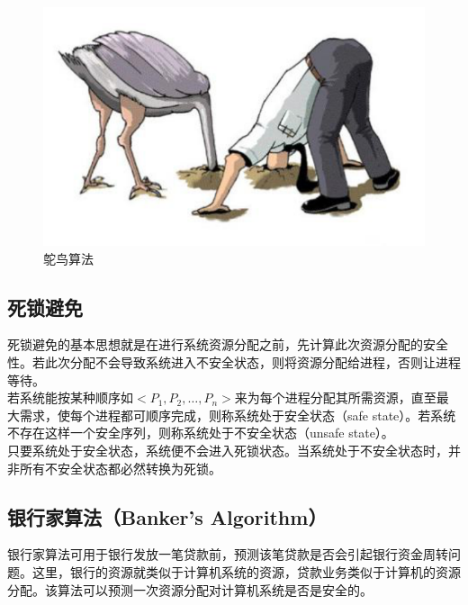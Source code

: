 \begin{figure}[H]
    \centering
    \includegraphics[scale=0.6]{img/Chapter2/2-9/1.png}
    \caption{鸵鸟算法}
\end{figure}

\vspace{0.5cm}

\subsection{死锁避免}

死锁避免的基本思想就是在进行系统资源分配之前，先计算此次资源分配的安全性。若此次分配不会导致系统进入不安全状态，则将资源分配给进程，否则让进程等待。\\

若系统能按某种顺序如$ <P_1, P_2, \dots, P_n> $来为每个进程分配其所需资源，直至最大需求，使每个进程都可顺序完成，则称系统处于安全状态（safe state）。若系统不存在这样一个安全序列，则称系统处于不安全状态（unsafe state）。\\

只要系统处于安全状态，系统便不会进入死锁状态。当系统处于不安全状态时，并非所有不安全状态都必然转换为死锁。\\

\subsection{银行家算法（Banker's Algorithm）}

银行家算法可用于银行发放一笔贷款前，预测该笔贷款是否会引起银行资金周转问题。这里，银行的资源就类似于计算机系统的资源，贷款业务类似于计算机的资源分配。该算法可以预测一次资源分配对计算机系统是否是安全的。\\

